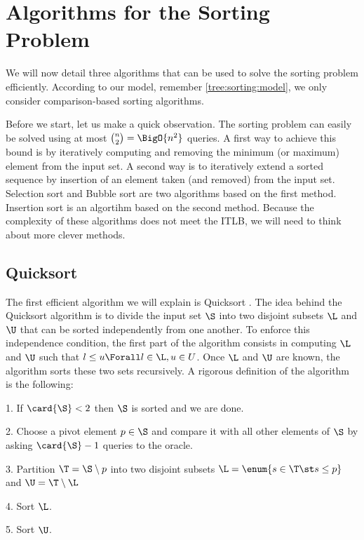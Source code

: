 \section{Algorithms for the Sorting Problem}
\label{tree:sorting:alg}

We will now detail three algorithms that can be used to solve the sorting
problem efficiently. According to our model, remember \ref{tree:sorting:model},
we only consider comparison-based sorting algorithms.

Before we start, let us make a quick observation. The sorting problem can
easily be solved using at most \(\binom{n}{2} = \BigO{n^2}\) queries. A first
way to achieve this bound is by iteratively computing and removing the minimum
(or maximum) element from the input set. A second way is to iteratively
extend a sorted sequence by insertion of an element taken (and removed) from
the input set. Selection sort and Bubble sort are two algorithms based on the
first method. Insertion sort is an algortihm based on the second method.
Because the complexity of these algorithms does not meet the ITLB, we will need
to think about more clever methods.

\subsection*{Quicksort}

The first efficient algorithm we will explain is Quicksort \cite{hoare:1962}.
The idea behind the Quicksort algorithm is to divide the input set \(\S\) into
two disjoint subsets \(\L\) and \(\U\) that can be sorted independently from
one another. To enforce this independence condition, the first part of
the algorithm consists in computing \(\L\) and \(\U\) such that \(l \le u \Forall l
\in \L, u \in U\). Once \(\L\) and \(\U\) are known, the algorithm sorts these
two sets recursively. A rigorous definition of the algorithm is the following:

\begin{algorithm}
\item[1.] If \(\card{\S} < 2\) then \(\S\) is sorted and we are done.
\item[2.] Choose a pivot element \(p \in \S\) and compare it with all other
elements of \(\S\) by asking \(\card{\S} - 1\) queries to the oracle.
\item[3.] Partition \(\T = \S \setminus p\) into two disjoint subsets
\(\L = \enum{s \in \T \st s \le p}\) and \(\U = \T \setminus \L\)
\item[4.] Sort \(\L\).
\item[5.] Sort \(\U\).
\end{algorithm}

